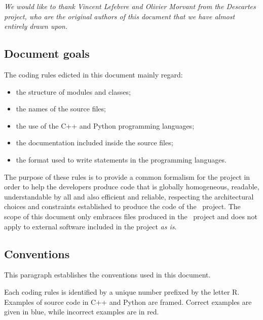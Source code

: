 
\emph{We would like to thank Vincent Lefebvre and Olivier Morvant from the Descartes project, who are the original authors of this document that we have almost entirely drawn upon.}

\subsection{Document goals}
The coding rules edicted in this document mainly regard:
\begin{itemize}
\item the structure of modules and classes;
\item the names of the source files;
\item the use of the C++ and Python programming languages;
\item the documentation included inside the source files;
\item the format used to write statements in the programming languages.
\end{itemize}

The purpose of these rules is to provide a common formalism for the project in order to help the developers produce code that is globally homogeneous, readable, understandable by all and also efficient and reliable, respecting the architectural choices and constraints established to produce the code of the \OT\ project. The scope of this document only embraces files produced in the \OT\ project and does not apply to external software included in the project \emph{as is}.

\subsection{Conventions}
This paragraph establishes the conventions used in this document.

Each coding rules is identified by a unique number prefixed by the letter R.
Examples of source code in C++ and Python are framed. Correct examples are given in blue, while incorrect examples are in red.

